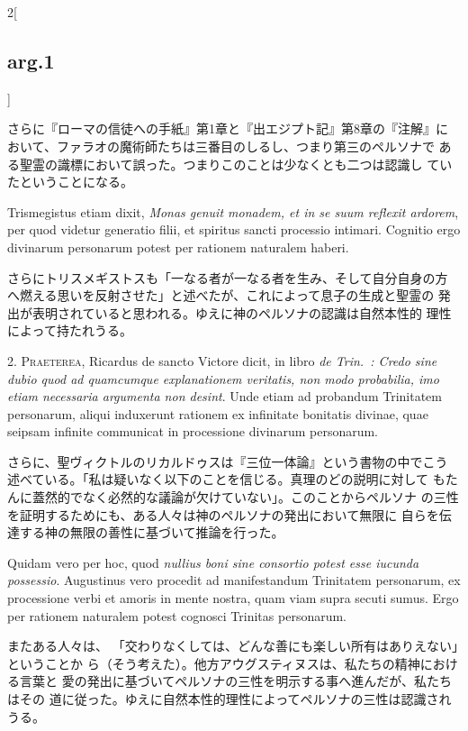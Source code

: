 \documentclass[paper=a4paper,fontsize=10pt,jafontsize=9pt,titlepage]{jlreq}
\begin{document}
\begin{paracol}{2}[\subsection{arg.1}]
\switchcolumn

さらに『ローマの信徒への手紙』第1章と『出エジプト記』第8章の『注解』に
 おいて、ファラオの魔術師たちは三番目のしるし、つまり第三のペルソナで
 ある聖霊の識標において誤った。つまりこのことは少なくとも二つは認識し
 ていたということになる。

\switchcolumn*

Trismegistus etiam dixit, {\itshape Monas genuit
monadem, et in se suum reflexit ardorem}, per quod videtur generatio
filii, et spiritus sancti processio intimari. Cognitio ergo divinarum
personarum potest per rationem naturalem haberi.

\switchcolumn

さらにトリスメギストスも「一なる者が一なる者を生み、そして自分自身の方
 へ燃える思いを反射させた」と述べたが、これによって息子の生成と聖霊の
 発出が表明されていると思われる。ゆえに神のペルソナの認識は自然本性的
 理性によって持たれうる。


2. {\scshape Praeterea}, Ricardus de sancto Victore dicit, in libro
 {\itshape de Trin.~: Credo
sine dubio quod ad quamcumque explanationem veritatis, non modo
probabilia, imo etiam necessaria argumenta non desint}. Unde etiam ad
probandum Trinitatem personarum, aliqui induxerunt rationem ex
infinitate bonitatis divinae, quae seipsam infinite communicat in
processione divinarum personarum.

\switchcolumn

さらに、聖ヴィクトルのリカルドゥスは『三位一体論』という書物の中でこう
 述べている。「私は疑いなく以下のことを信じる。真理のどの説明に対して
 もたんに蓋然的でなく必然的な議論が欠けていない」。このことからペルソナ
 の三性を証明するためにも、ある人々は神のペルソナの発出において無限に
 自らを伝達する神の無限の善性に基づいて推論を行った。

\switchcolumn*

Quidam vero per hoc, quod {\itshape nullius
boni sine consortio potest esse iucunda possessio}. Augustinus vero
procedit ad manifestandum Trinitatem personarum, ex processione verbi
et amoris in mente nostra, quam viam supra secuti sumus. Ergo per
rationem naturalem potest cognosci Trinitas personarum.

\switchcolumn

またある人々は、
 「交わりなくしては、どんな善にも楽しい所有はありえない」ということか
 ら（そう考えた）。他方アウグスティヌスは、私たちの精神における言葉と
 愛の発出に基づいてペルソナの三性を明示する事へ進んだが、私たちはその
 道に従った。ゆえに自然本性的理性によってペルソナの三性は認識されうる。


\end{paracol}
\end{document}
